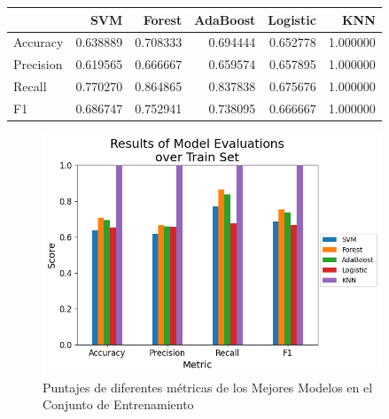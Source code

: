 \documentclass[12pt,a4paper]{article}
\begin{document}
{{            \begin{center}
                \begin{tabular}{lrrrrr}
                    \toprule
                        & SVM & Forest & AdaBoost & Logistic & KNN \\
                    \midrule
                        Accuracy & 0.638889 & 0.708333 & 0.694444 & 0.652778 & 1.000000 \\
                        Precision & 0.619565 & 0.666667 & 0.659574 & 0.657895 & 1.000000 \\
                        Recall & 0.770270 & 0.864865 & 0.837838 & 0.675676 & 1.000000 \\
                        F1 & 0.686747 & 0.752941 & 0.738095 & 0.666667 & 1.000000 \\
                    \bottomrule
                \end{tabular}
            \end{center}
            \begin{figure}[hbtp]
                \centering
                \includegraphics[width=0.9\textwidth]{./Resources/5_1.png}
                \caption{Puntajes de diferentes métricas de los Mejores Modelos en el Conjunto de Entrenamiento}
                \label{fig:res_train}
            \end{figure}

}}
\end{document}
